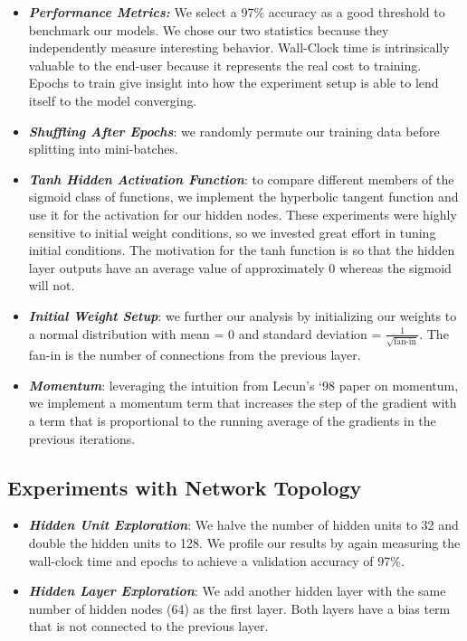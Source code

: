 \documentclass{article} %
\begin{document}
\begin{itemize}
\item \textbf{\textit{Performance Metrics:}} We select a 97\% accuracy as a good threshold to benchmark our models.  We chose our two statistics because they independently measure interesting behavior.  Wall-Clock time is intrinsically valuable to the end-user because it represents the real cost to training.  Epochs to train give insight into how the experiment setup is able to lend itself to the model converging.
\item \textbf{\textit{Shuffling After Epochs}}: we randomly permute our training data before splitting into mini-batches.  
\item \textbf{\textit{Tanh Hidden Activation Function}}: to compare different members of the sigmoid class of functions, we implement the hyperbolic tangent function and use it for the activation for our hidden nodes.  These experiments were highly sensitive to initial weight conditions, so we invested great effort in tuning initial conditions.  The motivation for the tanh function is so that the hidden layer outputs have an average value of approximately 0 whereas the sigmoid will not.  
\item \textbf{\textit{Initial Weight Setup}}: we further our analysis by initializing our weights to a normal distribution with mean = 0 and standard deviation = $\frac{1}{\sqrt{\text{fan-in}}}$.  The fan-in is the number of connections from the previous layer.
\item \textbf{\textit{Momentum}}: leveraging the intuition from Lecun's `98 paper on momentum, we implement a momentum term that increases the step of the gradient with a term that is proportional to the running average of the gradients in the previous iterations.  
\end{itemize}

\subsection*{Experiments with Network Topology}

\begin{itemize}
\item \textbf{\textit{Hidden Unit Exploration}}: We halve the number of hidden units to 32 and double the hidden units to 128.  We profile our results by again measuring the wall-clock time and epochs to achieve a validation accuracy of 97\%.
\item \textbf{\textit{Hidden Layer Exploration}}: We add another hidden layer with the same number of hidden nodes (64) as the first layer.  Both layers have a bias term that is not connected to the previous layer.  
\end{itemize}
\end{document}
